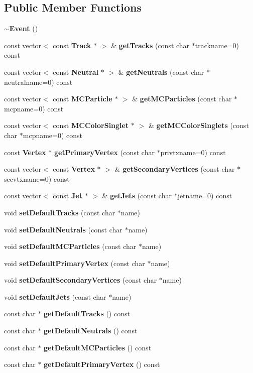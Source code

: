 \subsection*{Public Member Functions}
\begin{DoxyCompactItemize}
\item 
\textbf{ $\sim$\+Event} ()
\item 
const vector$<$ const \textbf{ Track} $\ast$ $>$ \& \textbf{ get\+Tracks} (const char $\ast$trackname=0) const
\item 
const vector$<$ const \textbf{ Neutral} $\ast$ $>$ \& \textbf{ get\+Neutrals} (const char $\ast$neutralname=0) const
\item 
const vector$<$ const \textbf{ M\+C\+Particle} $\ast$ $>$ \& \textbf{ get\+M\+C\+Particles} (const char $\ast$mcpname=0) const
\item 
const vector$<$ const \textbf{ M\+C\+Color\+Singlet} $\ast$ $>$ \& \textbf{ get\+M\+C\+Color\+Singlets} (const char $\ast$mcpname=0) const
\item 
const \textbf{ Vertex} $\ast$ \textbf{ get\+Primary\+Vertex} (const char $\ast$privtxname=0) const
\item 
const vector$<$ const \textbf{ Vertex} $\ast$ $>$ \& \textbf{ get\+Secondary\+Vertices} (const char $\ast$secvtxname=0) const
\item 
const vector$<$ const \textbf{ Jet} $\ast$ $>$ \& \textbf{ get\+Jets} (const char $\ast$jetname=0) const
\item 
void \textbf{ set\+Default\+Tracks} (const char $\ast$name)
\item 
void \textbf{ set\+Default\+Neutrals} (const char $\ast$name)
\item 
void \textbf{ set\+Default\+M\+C\+Particles} (const char $\ast$name)
\item 
void \textbf{ set\+Default\+Primary\+Vertex} (const char $\ast$name)
\item 
void \textbf{ set\+Default\+Secondary\+Vertices} (const char $\ast$name)
\item 
void \textbf{ set\+Default\+Jets} (const char $\ast$name)
\item 
const char $\ast$ \textbf{ get\+Default\+Tracks} () const
\item 
const char $\ast$ \textbf{ get\+Default\+Neutrals} () const
\item 
const char $\ast$ \textbf{ get\+Default\+M\+C\+Particles} () const
\item 
const char $\ast$ \textbf{ get\+Default\+Primary\+Vertex} () const

\end{DoxyCompactItemize}

